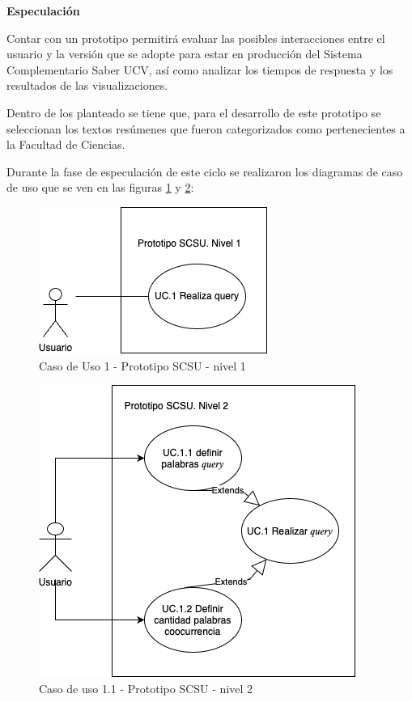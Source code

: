 \documentclass[
  12pt,
  openany]{book}
\begin{document}
\textbf{Especulación}

Contar con un prototipo permitirá evaluar las posibles interacciones entre el usuario y la versión que se adopte para estar en producción del Sistema Complementario Saber UCV, así como analizar los tiempos de respuesta y los resultados de las visualizaciones.

Dentro de los planteado se tiene que, para el desarrollo de este prototipo se seleccionan los textos resúmenes que fueron categorizados como pertenecientes a la Facultad de Ciencias.

Durante la fase de especulación de este ciclo se realizaron los diagramas de caso de uso que se ven en las figuras \ref{fig:protoUC1} y \ref{fig:protoUC11}:

\newpage

\begin{figure}

{\centering \includegraphics[width=0.45\linewidth]{images/05-desarrollo/2_ciclo/UC/prototipo_nivel1} 

}

\caption{Caso de Uso 1 - Prototipo SCSU - nivel 1}\label{fig:protoUC1}
\end{figure}

\begin{figure}

{\centering \includegraphics[width=0.45\linewidth]{images/05-desarrollo/2_ciclo/UC/prototipo_nivel2} 

}

\caption{Caso de uso 1.1 - Prototipo SCSU - nivel 2}\label{fig:protoUC11}
\end{figure}
\end{document}
